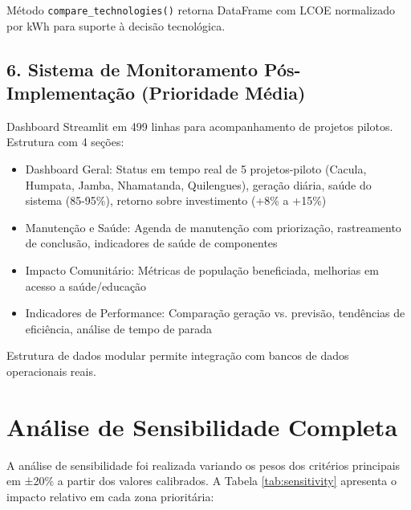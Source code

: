 \documentclass[12pt, a4paper]{article}
\begin{document}
Método \texttt{compare\_technologies()} retorna DataFrame com LCOE normalizado por kWh para suporte à decisão tecnológica.

\subsection{6. Sistema de Monitoramento Pós-Implementação (Prioridade Média)}

Dashboard Streamlit em 499 linhas para acompanhamento de projetos pilotos. Estrutura com 4 seções:

\begin{itemize}
    \item Dashboard Geral: Status em tempo real de 5 projetos-piloto (Cacula, Humpata, Jamba, Nhamatanda, Quilengues), geração diária, saúde do sistema (85-95\%), retorno sobre investimento (+8\% a +15\%)
    \item Manutenção e Saúde: Agenda de manutenção com priorização, rastreamento de conclusão, indicadores de saúde de componentes
    \item Impacto Comunitário: Métricas de população beneficiada, melhorias em acesso a saúde/educação
    \item Indicadores de Performance: Comparação geração vs. previsão, tendências de eficiência, análise de tempo de parada
\end{itemize}

Estrutura de dados modular permite integração com bancos de dados operacionais reais.

\appendix

\section{Análise de Sensibilidade Completa}

A análise de sensibilidade foi realizada variando os pesos dos critérios principais em ±20\% a partir dos valores calibrados. A Tabela \ref{tab:sensitivity} apresenta o impacto relativo em cada zona prioritária:
\end{document}
